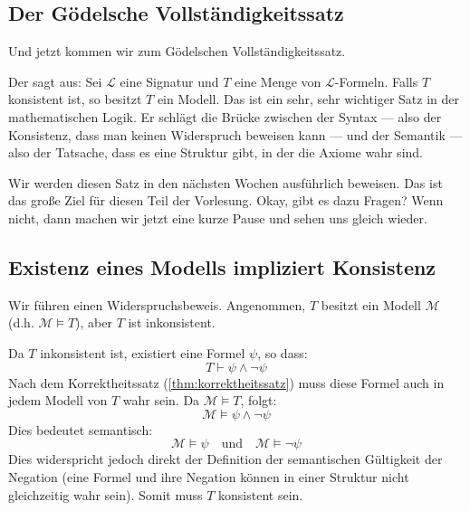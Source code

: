 \subsection{Der Gödelsche Vollständigkeitssatz}
\begin{spoken-clean}[00:28:32 - 00:31:10]
Und jetzt kommen wir zum Gödelschen Vollständigkeitssatz.

Der sagt aus: Sei $\mathcal{L}$ eine Signatur und $T$ eine Menge von $\mathcal{L}$-Formeln. Falls $T$ konsistent ist, so besitzt $T$ ein Modell. Das ist ein sehr, sehr wichtiger Satz in der mathematischen Logik. Er schlägt die Brücke zwischen der Syntax --- also der Konsistenz, dass man keinen Widerspruch beweisen kann --- und der Semantik --- also der Tatsache, dass es eine Struktur gibt, in der die Axiome wahr sind.

Wir werden diesen Satz in den nächsten Wochen ausführlich beweisen. Das ist das große Ziel für diesen Teil der Vorlesung. Okay, gibt es dazu Fragen? Wenn nicht, dann machen wir jetzt eine kurze Pause und sehen uns gleich wieder.
\end{spoken-clean}

\subsection{Existenz eines Modells impliziert Konsistenz}
\begin{math-stroke}

\begin{short-proof}
Wir führen einen Widerspruchsbeweis. Angenommen, $T$ besitzt ein Modell $\mathcal{M}$ (d.h. $\mathcal{M} \models T$), aber $T$ ist inkonsistent.
        
Da $T$ inkonsistent ist, existiert eine Formel $\psi$, so dass:
\[ T \vdash \psi \land \neg \psi \]
Nach dem Korrektheitssatz (\cref{thm:korrektheitssatz}) muss diese Formel auch in jedem Modell von $T$ wahr sein. Da $\mathcal{M} \models T$, folgt:
\[ \mathcal{M} \models \psi \land \neg \psi \]
Dies bedeutet semantisch:
\[ \mathcal{M} \models \psi \quad \text{und} \quad \mathcal{M} \models \neg \psi \]
Dies widerspricht jedoch direkt der Definition der semantischen Gültigkeit der Negation (eine Formel und ihre Negation können in einer Struktur nicht gleichzeitig wahr sein). Somit muss $T$ konsistent sein.
\end{short-proof}
\end{math-stroke}

